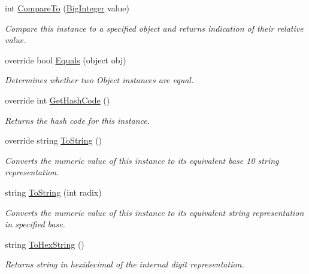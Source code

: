 \begin{DoxyCompactItemize}
int \hyperlink{class_scott_garland_1_1_big_integer_af0dbbd3bc5d77875df55f35d92f1e2b6}{Compare\+To} (\hyperlink{class_scott_garland_1_1_big_integer}{Big\+Integer} value)
\begin{DoxyCompactList}\small\item\em Compare this instance to a specified object and returns indication of their relative value. \end{DoxyCompactList}\item 
override bool \hyperlink{class_scott_garland_1_1_big_integer_a1d708cffb8ea8f6667cf69dfd60e41d1}{Equals} (object obj)
\begin{DoxyCompactList}\small\item\em Determines whether two Object instances are equal. \end{DoxyCompactList}\item 
override int \hyperlink{class_scott_garland_1_1_big_integer_a8437c07ab30cda55c559bf17f4466ead}{Get\+Hash\+Code} ()
\begin{DoxyCompactList}\small\item\em Returns the hash code for this instance. \end{DoxyCompactList}\item 
override string \hyperlink{class_scott_garland_1_1_big_integer_ac650e505ca8c6b7c86731ff4c158f006}{To\+String} ()
\begin{DoxyCompactList}\small\item\em Converts the numeric value of this instance to its equivalent base 10 string representation. \end{DoxyCompactList}\item 
string \hyperlink{class_scott_garland_1_1_big_integer_a975b135a066ddff12cbef21adf338357}{To\+String} (int radix)
\begin{DoxyCompactList}\small\item\em Converts the numeric value of this instance to its equivalent string representation in specified base. \end{DoxyCompactList}\item 
string \hyperlink{class_scott_garland_1_1_big_integer_a743cb38de54da022a77772bcbb0d80ec}{To\+Hex\+String} ()
\begin{DoxyCompactList}\small\item\em Returns string in hexidecimal of the internal digit representation. \end{DoxyCompactList}\end{DoxyCompactItemize}
